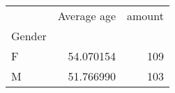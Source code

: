 \begin{tabular}{lrr}
\toprule
{} &  Average age &  amount \\
Gender &              &         \\
\midrule
F      &    54.070154 &     109 \\
M      &    51.766990 &     103 \\
\bottomrule
\end{tabular}
